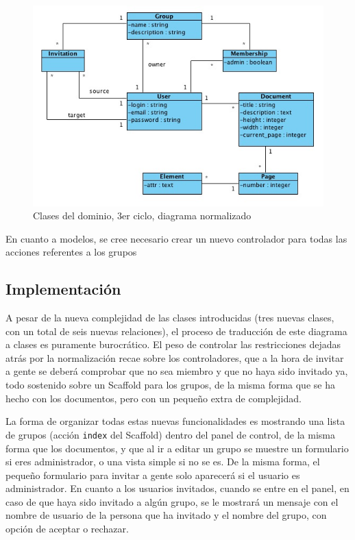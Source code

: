 \begin{figure}[h!]
\centering
\includegraphics[width=14cm]{uml3n.png}
\caption{Clases del dominio, 3er ciclo, diagrama normalizado}\label{fig:uml3n}
\end{figure}

En cuanto a modelos, se cree necesario crear un nuevo controlador para todas las acciones referentes a los grupos


\subsection{Implementación} %
\label{sub:implementación}

A pesar de la nueva complejidad de las clases introducidas (tres nuevas clases, con un total de seis nuevas relaciones), el proceso de traducción de este diagrama a clases es puramente burocrático. El peso de controlar las restricciones dejadas atrás por la normalización recae sobre los controladores, que a la hora de invitar a gente se deberá comprobar que no sea miembro y que no haya sido invitado ya, todo sostenido sobre un Scaffold para los grupos, de la misma forma que se ha hecho con los documentos, pero con un pequeño extra de complejidad.

La forma de organizar todas estas nuevas funcionalidades es mostrando una lista de grupos (acción \texttt{index} del Scaffold) dentro del panel de control, de la misma forma que los documentos, y que al ir a editar un grupo se muestre un formulario si eres administrador, o una vista simple si no se es. De la misma forma, el pequeño formulario para invitar a gente solo aparecerá si el usuario es administrador. En cuanto a los usuarios invitados, cuando se entre en el panel, en caso de que haya sido invitado a algún grupo, se le mostrará un mensaje con el nombre de usuario de la persona que ha invitado y el nombre del grupo, con opción de aceptar o rechazar.


